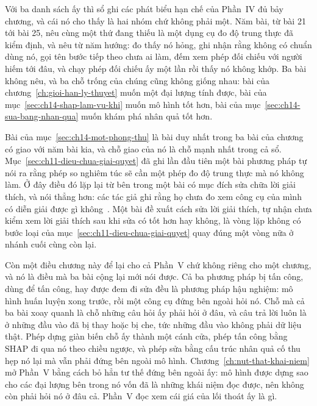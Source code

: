 %
Với ba danh sách ấy thì sổ ghi các phát biểu hạn chế của Phần~IV đủ bảy chương,
và cái nó cho thấy là hai nhóm chứ không phải một. Năm bài, từ bài 21 tới bài
25, nêu cùng một thứ đang thiếu là một dụng cụ đo độ trung thực đã kiểm định,
và nêu từ năm hướng: đo thấy nó hỏng, ghi nhận rằng không có chuẩn dùng nó, gọi
tên bước tiếp theo chưa ai làm, đếm xem phép đối chiếu với người hiếm tới đâu,
và chạy phép đối chiếu ấy một lần rồi thấy nó không khớp. Ba bài không nêu, và
ba chỗ trống của chúng cũng không giống nhau: bài của
chương~\ref{ch:gioi-han-ly-thuyet} muốn một đại lượng tính được, bài của
mục~\ref{sec:ch14-shap-lam-vu-khi} muốn mô hình tốt hơn, bài của
mục~\ref{sec:ch14-sua-bang-nhan-qua} muốn khám phá nhân quả tốt hơn.

Bài của mục~\ref{sec:ch14-mot-phong-thu} là bài duy nhất trong ba bài của
chương có giao với năm bài kia, và chỗ giao của nó là chỗ mạnh nhất trong cả
sổ. Mục~\ref{sec:ch11-dieu-chua-giai-quyet} đã ghi lần đầu tiên một bài phương
pháp tự nói ra rằng phép so nghiêm túc sẽ cần một phép đo độ trung thực mà nó
không làm. Ở đây điều đó lặp lại từ bên trong một bài có mục đích sửa chữa lời
giải thích, và nói thẳng hơn: các tác giả ghi rằng họ chưa đo xem công cụ của
mình có diễn giải được gì không~\autocite{p27shlime}. Một bài đề xuất cách sửa
lời giải thích, tự nhận chưa kiểm xem lời giải thích sau khi sửa có tốt hơn hay
không, là vòng lặp không có bước loại của
mục~\ref{sec:ch11-dieu-chua-giai-quyet} quay đúng một vòng nữa ở nhánh cuối
cùng còn lại.

%
Còn một điều chương này để lại cho cả Phần~V chứ không riêng cho một chương, và
nó là điều mà ba bài cộng lại mới nói được. Cả ba phương pháp bị tấn công, dùng
để tấn công, hay được đem đi sửa đều là phương pháp hậu nghiệm: mô hình huấn
luyện xong trước, rồi một công cụ đứng bên ngoài hỏi nó. Chỗ mà cả ba bài xoay
quanh là chỗ những câu hỏi ấy phải hỏi ở đâu, và câu trả lời luôn là ở những
đầu vào đã bị thay hoặc bị che, tức những đầu vào không phải dữ liệu thật. Phép
dựng giàn biến chỗ ấy thành một cánh cửa, phép tấn công bằng SHAP đi qua nó
theo chiều ngược, và phép sửa bằng cấu trúc nhân quả cố thu hẹp nó lại mà vẫn
phải đứng bên ngoài mô hình. Chương~\ref{ch:nut-that-khai-niem} mở Phần~V bằng
cách bỏ hẳn tư thế đứng bên ngoài ấy: mô hình được dựng sao cho các đại lượng
bên trong nó vốn đã là những khái niệm đọc được, nên không còn phải hỏi nó ở
đâu cả. Phần~V đọc xem cái giá của lối thoát ấy là gì.

